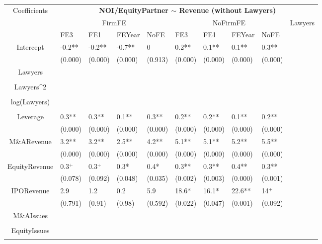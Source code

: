 \documentclass{article}
\begin{document}
\begin{table}[H]
\centering
\begin{tabular}{|clllllllll|}
\hline
\multirow{3}{*}{Coefficients} & \multicolumn{9}{c|}{\textbf{NOI/EquityPartner $\sim$ Revenue (without Lawyers)}} \\
\cline{2-10}
& \multicolumn{4}{c}{FirmFE} & \multicolumn{4}{c}{NoFirmFE} & \multirow{2}{*}{Lawyers} \\
\cline{2-9}
& FE3 & FE1 & FEYear & NoFE & FE3 & FE1 & FEYear & NoFE &  \\
\hline
 
Intercept & -0.2** & -0.2** & -0.7** & 0 & 0.2** & 0.1** & 0.1** & 0.3** & \\ 
   & (0.000) & (0.000) & (0.000) & (0.913) & (0.000) & (0.000) & (0.000) & (0.000) & \\ 
  Lawyers &  &  &  &  &  &  &  &  & \\ 
   &  &  &  &  &  &  &  &  & \\ 
  Lawyers^2 &  &  &  &  &  &  &  &  & \\ 
   &  &  &  &  &  &  &  &  & \\ 
  log(Lawyers) &  &  &  &  &  &  &  &  & \\ 
   &  &  &  &  &  &  &  &  & \\ 
  Leverage & 0.3** & 0.3** & 0.1** & 0.3** & 0.2** & 0.2** & 0.1** & 0.2** & \\ 
   & (0.000) & (0.000) & (0.000) & (0.000) & (0.000) & (0.000) & (0.000) & (0.000) & \\ 
  M\&ARevenue & 3.2** & 3.2** & 2.5** & 4.2** & 5.1** & 5.1** & 5.2** & 5.5** & \\ 
   & (0.000) & (0.000) & (0.000) & (0.000) & (0.000) & (0.000) & (0.000) & (0.000) & \\ 
  EquityRevenue & 0.3$^{+}$ & 0.3$^{+}$ & 0.3* & 0.4* & 0.3** & 0.3** & 0.4** & 0.3** & \\ 
   & (0.078) & (0.092) & (0.048) & (0.035) & (0.002) & (0.003) & (0.000) & (0.001) & \\ 
  IPORevenue & 2.9 & 1.2 & 0.2 & 5.9 & 18.6* & 16.1* & 22.6** & 14$^{+}$ & \\ 
   & (0.791) & (0.91) & (0.98) & (0.592) & (0.022) & (0.047) & (0.001) & (0.092) & \\ 
  M\&AIssues &  &  &  &  &  &  &  &  & \\ 
   &  &  &  &  &  &  &  &  & \\ 
  EquityIssues &  &  &  &  &  &  &  &  & \\ 
   &  &  &  &  &  &  &  &  & \\ 

\end{tabular}
\end{table}
\end{document}
